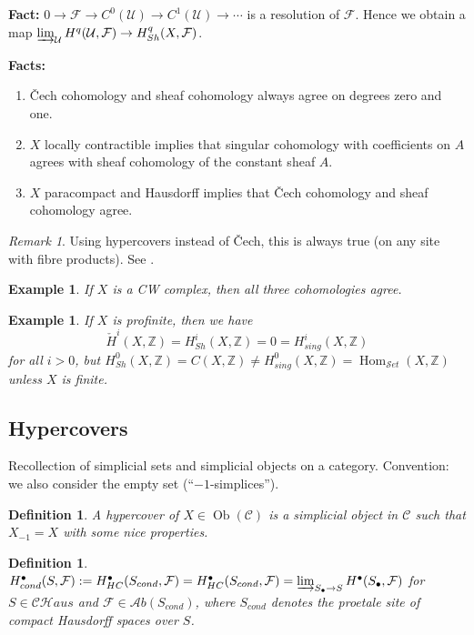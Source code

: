 \documentclass[12pt]{article}
\theoremstyle{darkgreentheorem}
\theoremstyle{darkbluedefinition}
\newtheorem{defn}[thm]{Definition}
\theoremstyle{darkredexample}
\newtheorem{exa}[thm]{Example}
\theoremstyle{remark}
\newtheorem{rem}[thm]{Remark}
\newcommand{\Z}{\mathbb{Z}}
\newcommand{\1}{\mathbbm{1}}
\newcommand{\scrC}{\mathscr{C}}
\newcommand{\CHaus}{\mathscr{CH}aus}
\newcommand{\Ab}{\mathscr{A}b}
\newcommand{\Set}{\mathscr{S}et}
\newcommand{\F}{\mathcal{F}}
\newcommand{\U}{\mathcal{U}}
\DeclareMathOperator{\Hom}{Hom}
\DeclareMathOperator{\Ob}{Ob}
\newcommand{\grd}{^{\bullet}}
\begin{document}
\textbf{Fact:} $0\to \F\to C^{0}(\U) \to C^{1}(\U)\to \cdots $ is a resolution of $\F$.
Hence  we obtain a map $\varinjlim_{\U}H^{q}(\U,\F)\to H^{q}_{Sh}(X,\F)$.

\textbf{Facts:}
\begin{enumerate}[label=\arabic*)]
    \item \v{C}ech cohomology and sheaf cohomology always agree on degrees zero and one.
    \item $X$ locally contractible implies that singular cohomology with coefficients on $A$ agrees with sheaf cohomology of the constant sheaf $A$.
    \item $X$ paracompact and Hausdorff implies that \v{C}ech cohomology and sheaf cohomology agree.
\end{enumerate}

\begin{rem}
    Using hypercovers instead of \v{C}ech, this is always true (on any site with fibre products).
    See \cite[\href{https://stacks.math.columbia.edu/tag/01H0}{Tag 01H0}]{sta19}.
\end{rem}

\begin{exa}
    If $X$ is a CW complex, then all three cohomologies agree.
\end{exa}

\begin{exa}
    If $X$ is profinite, then we have
    \[ \check{H}^{i}(X,\Z)=H^{i}_{Sh}(X,\Z)=0=H^{i}_{sing}(X,\Z) \]
    for all $i>0$, but $H^{0}_{Sh}(X,\Z)=C(X,\Z)\neq H^{0}_{sing}(X,\Z)=\Hom_{\Set}(X,\Z)$ unless $X$ is finite.
\end{exa}

\subsection{Hypercovers}

Recollection of simplicial sets and simplicial objects on a category.
Convention: we also consider the empty set (``$-1$-simplices'').

\begin{defn}
    A \textit{hypercover} of $X\in \Ob(\scrC)$ is a simplicial object in $\scrC$ such that $X_{-1}=X$ with some nice properties.
\end{defn}

\begin{defn}
    $H_{cond}\grd(S,\F):=H\grd_{HC}(S_{cond},\F)=H\grd_{HC}(S_{cond},\F)=\varinjlim_{S_{\bullet}\to S}H\grd(S_{\bullet},\F)$ for $S\in \CHaus$ and $\F\in \Ab(S_{cond})$, where $S_{cond}$ denotes the proetale site of compact Hausdorff spaces over $S$.
\end{defn}
\end{document}
